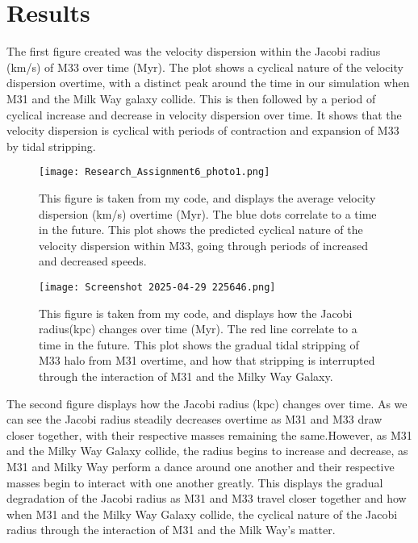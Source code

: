 \documentclass{aastex7}
\begin{document}
\section{Results}
The first figure created was the velocity dispersion within the Jacobi radius (km/s) of M33 over time (Myr). The plot shows a cyclical nature of the velocity dispersion overtime, with a distinct peak around the time in our simulation when M31 and the Milk Way galaxy collide. This is then followed by a period of cyclical increase and decrease in velocity dispersion over time. It shows that the velocity dispersion is cyclical with periods of contraction and expansion of M33 by tidal stripping.

\begin{figure}[h]
    \centering
    \texttt{[image: Research\_Assignment6\_photo1.png]}
    \caption{This figure is taken from my code, and displays the average velocity dispersion (km/s) overtime (Myr). The blue dots correlate to a time in the future. This plot shows the predicted cyclical nature of the velocity dispersion within M33, going through periods of increased and decreased speeds.}
    \label{Figure 3}
\end{figure}
\begin{figure}[h]
    \centering
    \texttt{[image: Screenshot 2025-04-29 225646.png]}
    \caption{This figure is taken from my code, and displays how the Jacobi radius(kpc) changes over time (Myr). The red line correlate to a time in the future. This plot shows the gradual tidal stripping of M33 halo from M31 overtime, and how that stripping is interrupted through the interaction of M31 and the Milky Way Galaxy.}
    \label{Figure 4}
\end{figure}
The second figure displays how the Jacobi radius (kpc) changes over time. As we can see the Jacobi radius steadily decreases overtime as M31 and M33 draw closer together, with their respective masses remaining the same.However, as M31 and the Milky Way Galaxy collide, the radius begins to increase and decrease, as M31 and Milky Way perform a dance around one another and their respective masses begin to interact with one another greatly. This displays the gradual degradation of the Jacobi radius as M31 and M33 travel closer together and how when M31 and the Milky Way Galaxy collide, the cyclical nature of the Jacobi radius through the interaction of M31 and the Milk Way's matter. 
\end{document}

